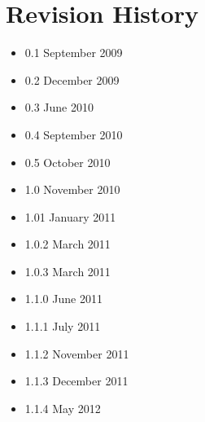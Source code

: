 \documentclass[11pt]{article}
\begin{document}
\section*{Revision History}
\begin{itemize}
\item 0.1 September 2009
\item 0.2 December 2009
\item 0.3 June 2010
\item 0.4 September 2010
\item 0.5 October 2010
\item 1.0 November 2010
\item 1.01 January 2011
\item 1.0.2 March 2011
\item 1.0.3 March 2011
\item 1.1.0 June 2011
\item 1.1.1 July 2011
\item 1.1.2 November 2011
\item 1.1.3 December 2011
\item 1.1.4 May 2012
\end{itemize}



\end{document}
